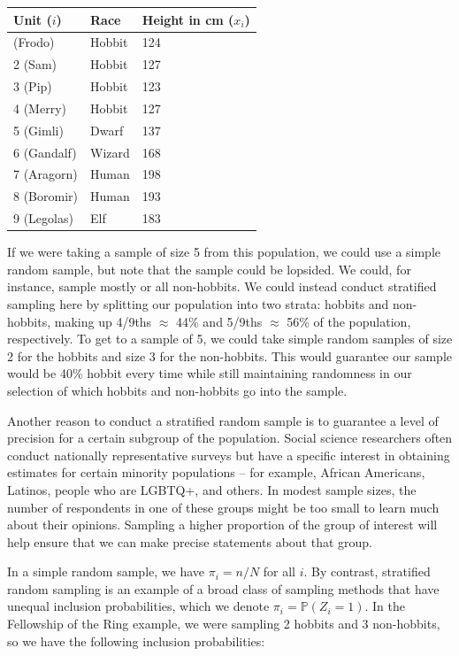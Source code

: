 \documentclass[
  13pt,
  letterpaper,
  DIV=11,
  numbers=noendperiod]{scrreprt}
\newcounter{none} %
\renewcommand{\P}{\mathbb{P}}
\theoremstyle{plain}
\theoremstyle{plain}
\theoremstyle{definition}
\theoremstyle{definition}
\theoremstyle{remark}
\begin{document}
{\def\LTcaptype{none} %
\begin{longtable}[]{@{}lll@{}}
\toprule\noalign{}
Unit (\(i\)) & Race & Height in cm (\(x_i\)) \\
\midrule\noalign{}
\endhead
\bottomrule\noalign{}
\endlastfoot
1 (Frodo) & Hobbit & 124 \\
2 (Sam) & Hobbit & 127 \\
3 (Pip) & Hobbit & 123 \\
4 (Merry) & Hobbit & 127 \\
5 (Gimli) & Dwarf & 137 \\
6 (Gandalf) & Wizard & 168 \\
7 (Aragorn) & Human & 198 \\
8 (Boromir) & Human & 193 \\
9 (Legolas) & Elf & 183 \\
\end{longtable}
}

If we were taking a sample of size 5 from this population, we could use
a simple random sample, but note that the sample could be lopsided. We
could, for instance, sample mostly or all non-hobbits. We could instead
conduct stratified sampling here by splitting our population into two
strata: hobbits and non-hobbits, making up 4/9ths \(\approx\) 44\% and
5/9ths \(\approx\) 56\% of the population, respectively. To get to a
sample of 5, we could take simple random samples of size 2 for the
hobbits and size 3 for the non-hobbits. This would guarantee our sample
would be 40\% hobbit every time while still maintaining randomness in
our selection of which hobbits and non-hobbits go into the sample.

Another reason to conduct a stratified random sample is to guarantee a
level of precision for a certain subgroup of the population. Social
science researchers often conduct nationally representative surveys but
have a specific interest in obtaining estimates for certain minority
populations -- for example, African Americans, Latinos, people who are
LGBTQ+, and others. In modest sample sizes, the number of respondents in
one of these groups might be too small to learn much about their
opinions. Sampling a higher proportion of the group of interest will
help ensure that we can make precise statements about that group.

In a simple random sample, we have \(\pi_i = n/N\) for all \(i\). By
contrast, stratified random sampling is an example of a broad class of
sampling methods that have unequal inclusion probabilities, which we
denote \(\pi_i = \P(Z_{i} = 1)\). In the Fellowship of the Ring example,
we were sampling 2 hobbits and 3 non-hobbits, so we have the following
inclusion probabilities:
\end{document}
